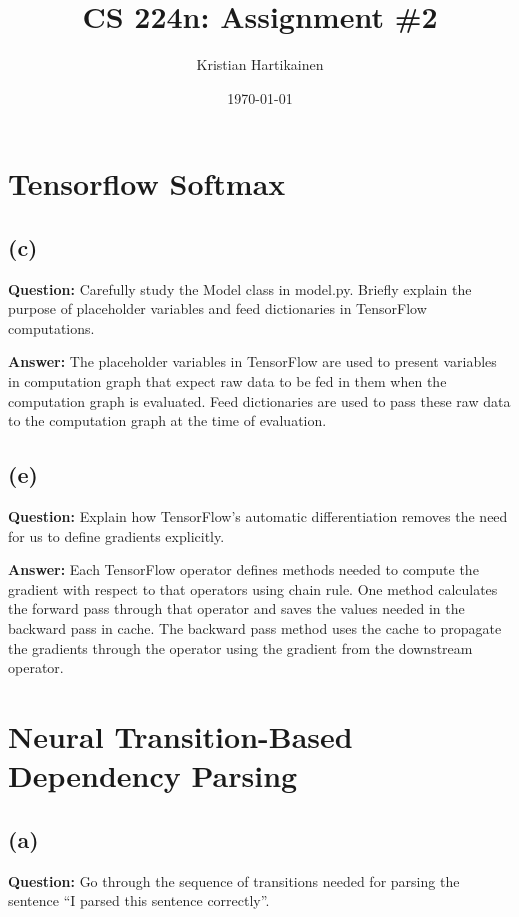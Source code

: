 \documentclass[11pt]{article}
\title{ CS 224n: Assignment \#2 }
\author{Kristian Hartikainen}
\date{\today}
\begin{document}
\maketitle

\section{Tensorflow Softmax}
\subsection*{(c)}
\textbf{Question:} Carefully study the Model class in model.py. Briefly explain the purpose
of placeholder variables and feed dictionaries in TensorFlow computations.

\textbf{Answer:} The placeholder variables in TensorFlow are used to present variables in computation graph that expect raw data to be fed in them when the computation graph is evaluated. Feed dictionaries are used to pass these raw data to the computation graph at the time of evaluation.

\subsection*{(e)}
\textbf{Question:} Explain how TensorFlow’s automatic differentiation removes the need for us to define gradients explicitly.

\textbf{Answer:} Each TensorFlow operator defines methods needed to compute the gradient with respect to that operators using chain rule. One method calculates the forward pass through that operator and saves the values needed in the backward pass in cache. The backward pass method uses the cache to propagate the gradients through the operator using the gradient from the downstream operator.

\section{Neural Transition-Based Dependency Parsing}
\subsection*{(a)}
\textbf{Question:} Go through the sequence of transitions needed for parsing the sentence “I parsed this sentence correctly”.
\end{document}
